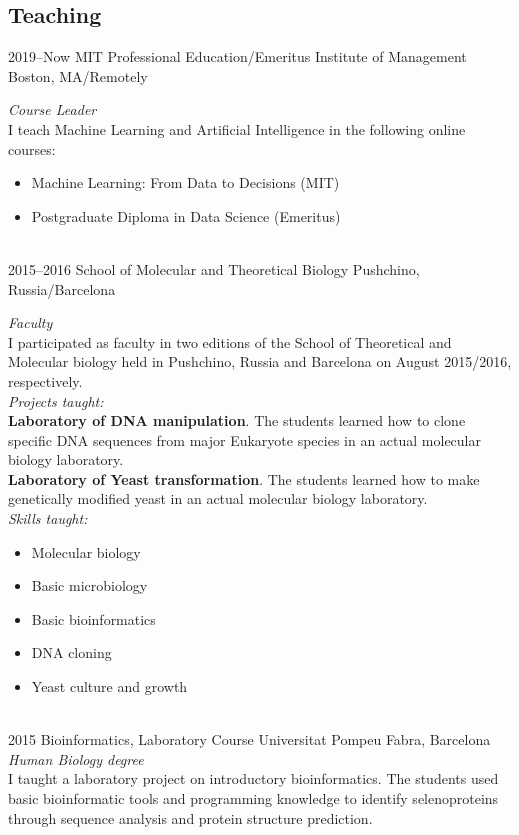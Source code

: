 \documentclass[]{friggeri-cv} %
\begin{document}
\subsection{Teaching}

\begin{entrylist}

\entry
{2019--Now}
{MIT Professional Education/Emeritus Institute of Management}
{Boston, MA/Remotely}
{\emph{Course Leader}\\
  I teach Machine Learning and Artificial Intelligence in the following online courses:\\
\begin{itemize}
  \item Machine Learning: From Data to Decisions (MIT)
  \item Postgraduate Diploma in Data Science (Emeritus)
\end{itemize}
}\\



\entry
{2015--2016}
{School of Molecular and Theoretical Biology}
{Pushchino, Russia/Barcelona}
{\emph{Faculty}\\
I participated as faculty in two editions of the School of Theoretical
and Molecular biology held in Pushchino, Russia and Barcelona on
August 2015/2016, respectively.\\
{\em Projects taught:}\\
{\bf Laboratory of DNA manipulation}. The students learned how to clone specific DNA
sequences from major Eukaryote species in an actual molecular biology laboratory. \\
{\bf Laboratory of Yeast transformation}. The students learned how to make genetically
modified yeast in an actual molecular biology laboratory. \\
{\em Skills taught:}
\begin{itemize}
  \item Molecular biology
  \item Basic microbiology
  \item Basic bioinformatics
  \item DNA cloning
  \item Yeast culture and growth
\end{itemize}
}\\


\entry
{2015}
{Bioinformatics, Laboratory Course}
{Universitat Pompeu Fabra, Barcelona}
{\emph{Human Biology degree} \\
I taught a laboratory project on introductory bioinformatics. The students
used basic bioinformatic tools and programming knowledge to
identify selenoproteins through sequence analysis and protein
structure prediction.} \\


\end{entrylist}
\end{document}
